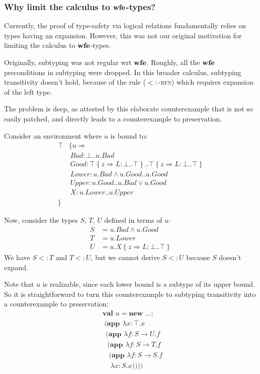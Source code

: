 \documentclass[9pt]{sigplanconf}
\newcommand{\sub}{<:}
\newcommand{\nswfe}{\mbox{\textbf{wfe}}}
\newcommand{\tfun}{\rightarrow}
\newcommand{\tand}{\wedge}
\newcommand{\tor}{\vee}
\newcommand{\refine}[2]{\left\{#1 \Rightarrow #2 \right\}}
\newcommand{\mlrefine}[2]{\{#1 \Rightarrow #2 \}}
\newcommand{\abs}[3]{\lambda #1\!:\!#2.#3}
\newcommand{\mlnew}[3]{\textbf{val }#1 = \textbf{new }#2 ;\;\\&#3}
\newcommand{\Ldecl}[3]{#1 : #2..#3}%
\newcommand{\Top}{\top}%
\newcommand{\Bot}{\bot}%
\newcommand{\mlapp}[2]{(\textbf{app }#1\;\\&#2)}
\begin{document}
\subsubsection{Why limit the calculus to $\nswfe$-types?}

Currently, the proof of type-safety via logical relations
fundamentally relies on types having an expansion. However, this was
not our original motivation for limiting the calculus to $\nswfe$-types.

Originally, subtyping was not regular wrt $\nswfe$. Roughly,
all the $\nswfe$ preconditions in subtyping were dropped. In this
broader calculus, subtyping transitivity doesn't hold, because of the
rule (\textsc{$\sub$-rfn}) which requires expansion of the left type.

The problem is deep, as attested by this elaborate counterexample
that is not so easily patched, and directly leads to a counterexample
to preservation.

Consider an environment where $u$ is bound to:
\begin{align*}
\Top & \mlrefine u {\\
&\ \Ldecl {\mathit{Bad}} {\Bot} {u.\mathit{Bad}}\\
&\ \Ldecl {\mathit{Good}} {\Top \refine z {\Ldecl L \Bot \Top}} {\Top \refine z {\Ldecl L \Bot \Top}}\\
&\ \Ldecl {\mathit{Lower}} {u.\mathit{Bad} \tand u.\mathit{Good}} {u.\mathit{Good}}\\
&\ \Ldecl {\mathit{Upper}} {u.\mathit{Good}} {u.\mathit{Bad} \tor u.\mathit{Good}}\\
&\ \Ldecl X {u.\mathit{Lower}} {u.\mathit{Upper}}\\
}&
\end{align*}

Now, consider the types $S$, $T$, $U$ defined in terms of $u$:
\begin{align*}
S &= u.\mathit{Bad} \tand u.\mathit{Good}\\
T &= u.\mathit{Lower}\\
U &= u.X \refine z {\Ldecl L \Bot \Top}
\end{align*}
We have $S \sub T$ and $T \sub U$, but we cannot derive $S \sub U$ because
$S$ doesn't expand.

Note that $u$ is realizable, since each lower bound is a subtype of
its upper bound. So it is straightforward to turn this counterexample
to subtyping transitivity into a counterexample to preservation:
\begin{align*}
&\mlnew u \ldots {
\ \mlapp{\abs x \Top x}{
\ \ \mlapp{\abs f {S \tfun U} f}{
\ \ \ \mlapp{\abs f {S \tfun T} f}{
\ \ \ \ \mlapp{\abs f {S \tfun S} f}{
\ \ \  \ \ \abs x S x}}}}}
\end{align*}
\end{document}
